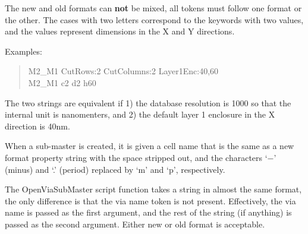 The new and old formats can {\bf not} be mixed, all tokens must follow
one format or the other.  The cases with two letters correspond to the
keywords with two values, and the values represent dimensions in the X
and Y directions.

Examples:\\
\begin{quote}\vt
M2\_M1 CutRows:2 CutColumns:2 Layer1Enc:40,60\\
M2\_M1 c2 d2 h60
\end{quote}

The two strings are equivalent if 1) the database resolution is 1000
so that the internal unit is nanomenters, and 2) the default layer 1
enclosure in the X direction is 40nm.

When a sub-master is created, it is given a cell name that is the same
as a new format property string with the space stripped out, and the
characters `$-$' (minus) and `.' (period) replaced by `{\vt m}' and
`{\vt p}', respectively.

The {\vt OpenViaSubMaster} script function takes a string in almost
the same format, the only difference is that the via name token is not
present.  Effectively, the via name is passed as the first argument,
and the rest of the string (if anything) is passed as the second
argument.  Either new or old format is acceptable.


